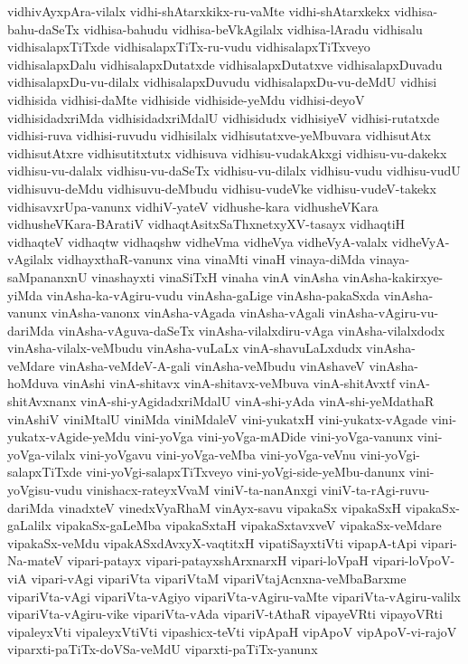 {vidhivAyxpAra-vilalx
vidhi-shAtarxkikx-ru-vaMte
vidhi-shAtarxkekx
vidhisa-bahu-daSeTx
vidhisa-bahudu
vidhisa-beVkAgilalx
vidhisa-lAradu
vidhisalu
vidhisalapxTiTxde
vidhisalapxTiTx-ru-vudu
vidhisalapxTiTxveyo
vidhisalapxDalu
vidhisalapxDutatxde
vidhisalapxDutatxve
vidhisalapxDuvadu
vidhisalapxDu-vu-dilalx
vidhisalapxDuvudu
vidhisalapxDu-vu-deMdU
vidhisi
vidhisida
vidhisi-daMte
vidhiside
vidhiside-yeMdu
vidhisi-deyoV
vidhisidadxriMda
vidhisidadxriMdalU
vidhisidudx
vidhisiyeV
vidhisi-rutatxde
vidhisi-ruva
vidhisi-ruvudu
vidhisilalx
vidhisutatxve-yeMbuvara
vidhisutAtx
vidhisutAtxre
vidhisutitxtutx
vidhisuva
vidhisu-vudakAkxgi
vidhisu-vu-dakekx
vidhisu-vu-dalalx
vidhisu-vu-daSeTx
vidhisu-vu-dilalx
vidhisu-vudu
vidhisu-vudU
vidhisuvu-deMdu
vidhisuvu-deMbudu
vidhisu-vudeVke
vidhisu-vudeV-takekx
vidhisavxrUpa-vanunx
vidhiV-yateV
vidhushe-kara
vidhusheVKara
vidhusheVKara-BAratiV
vidhaqtAsitxSaThxnetxyXV-tasayx
vidhaqtiH
vidhaqteV
vidhaqtw
vidhaqshw
vidheVma
vidheVya
vidheVyA-valalx
vidheVyA-vAgilalx
vidhayxthaR-vanunx
vina
vinaMti
vinaH
vinaya-diMda
vinaya-saMpananxnU
vinashayxti
vinaSiTxH
vinaha
vinA
vinAsha
vinAsha-kakirxye-yiMda
vinAsha-ka-vAgiru-vudu
vinAsha-gaLige
vinAsha-pakaSxda
vinAsha-vanunx
vinAsha-vanonx
vinAsha-vAgada
vinAsha-vAgali
vinAsha-vAgiru-vu-dariMda
vinAsha-vAguva-daSeTx
vinAsha-vilalxdiru-vAga
vinAsha-vilalxdodx
vinAsha-vilalx-veMbudu
vinAsha-vuLaLx
vinA-shavuLaLxdudx
vinAsha-veMdare
vinAsha-veMdeV-A-gali
vinAsha-veMbudu
vinAshaveV
vinAsha-hoMduva
vinAshi
vinA-shitavx
vinA-shitavx-veMbuva
vinA-shitAvxtf
vinA-shitAvxnanx
vinA-shi-yAgidadxriMdalU
vinA-shi-yAda
vinA-shi-yeMdathaR
vinAshiV
viniMtalU
viniMda
viniMdaleV
vini-yukatxH
vini-yukatx-vAgade
vini-yukatx-vAgide-yeMdu
vini-yoVga
vini-yoVga-mADide
vini-yoVga-vanunx
vini-yoVga-vilalx
vini-yoVgavu
vini-yoVga-veMba
vini-yoVga-veVnu
vini-yoVgi-salapxTiTxde
vini-yoVgi-salapxTiTxveyo
vini-yoVgi-side-yeMbu-danunx
vini-yoVgisu-vudu
vinishacx-rateyxVvaM
viniV-ta-nanAnxgi
viniV-ta-rAgi-ruvu-dariMda
vinadxteV
vinedxVyaRhaM
vinAyx-savu
vipakaSx
vipakaSxH
vipakaSx-gaLalilx
vipakaSx-gaLeMba
vipakaSxtaH
vipakaSxtavxveV
vipakaSx-veMdare
vipakaSx-veMdu
vipakASxdAvxyX-vaqtitxH
vipatiSayxtiVti
vipapA-tApi
vipari-Na-mateV
vipari-patayx
vipari-patayxshArxnarxH
vipari-loVpaH
vipari-loVpoV-viA
vipari-vAgi
vipariVta
vipariVtaM
vipariVtajAcnxna-veMbaBarxme
vipariVta-vAgi
vipariVta-vAgiyo
vipariVta-vAgiru-vaMte
vipariVta-vAgiru-valilx
vipariVta-vAgiru-vike
vipariVta-vAda
vipariV-tAthaR
vipayeVRti
vipayoVRti
vipaleyxVti
vipaleyxVtiVti
vipashicx-teVti
vipApaH
vipApoV
vipApoV-vi-rajoV
viparxti-paTiTx-doVSa-veMdU
viparxti-paTiTx-yanunx
}
